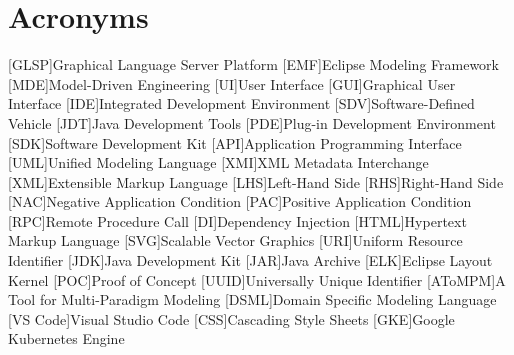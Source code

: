 \newpage
\section{Acronyms}
\label{sec:acronyms}
\begin{acronym}[AToMPM]
    [GLSP]{Graphical Language Server Platform}
    [EMF]{Eclipse Modeling Framework}
    [MDE]{Model-Driven Engineering}
    [UI]{User Interface}
    [GUI]{Graphical User Interface}
    [IDE]{Integrated Development Environment}
    [SDV]{Software-Defined Vehicle}
    [JDT]{Java Development Tools}
    [PDE]{Plug-in Development Environment}
    [SDK]{Software Development Kit}
    [API]{Application Programming Interface}
    [UML]{Unified Modeling Language}
    [XMI]{XML Metadata Interchange}
    [XML]{Extensible Markup Language}
    [LHS]{Left-Hand Side}
    [RHS]{Right-Hand Side}
    [NAC]{Negative Application Condition}
    [PAC]{Positive Application Condition}
    [RPC]{Remote Procedure Call}
    [DI]{Dependency Injection}
    [HTML]{Hypertext Markup Language}
    [SVG]{Scalable Vector Graphics}
    [URI]{Uniform Resource Identifier}
    [JDK]{Java Development Kit}
    [JAR]{Java Archive}
    [ELK]{Eclipse Layout Kernel}
    [POC]{Proof of Concept}
    [UUID]{Universally Unique Identifier}
    [AToMPM]{A Tool for Multi-Paradigm Modeling}
    [DSML]{Domain Specific Modeling Language}
    [VS Code]{Visual Studio Code}
    [CSS]{Cascading Style Sheets}
    [GKE]{Google Kubernetes Engine}
  \end{acronym}